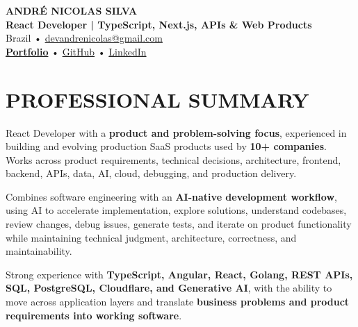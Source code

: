 \documentclass[10pt,a4paper]{article}
\begin{document}

\begin{center}

    {\LARGE \textbf{ANDRÉ NICOLAS SILVA}} \\[-2pt]

    {\normalsize \textbf{React Developer | TypeScript, Next.js, APIs \& Web Products}} \\[1pt]

    \footnotesize
    Brazil \quad • \quad
    \href{mailto:devandrenicolas@gmail.com}{devandrenicolas@gmail.com} \\[-1pt]

    \textbf{\href{https://portfolio-andrenicolas.vercel.app}{Portfolio}}
    \quad • \quad
    \href{https://github.com/devAndreNicolas}{GitHub}
    \quad • \quad
    \href{https://www.linkedin.com/in/devandrenicolas}{LinkedIn}

\end{center}

\vspace{-3pt}


\section*{PROFESSIONAL SUMMARY}

\footnotesize

React Developer with a \textbf{product and problem-solving focus},
experienced in building and evolving production SaaS products used by
\textbf{10+ companies}. Works across product requirements, technical
decisions, architecture, frontend, backend, APIs, data, AI, cloud,
debugging, and production delivery.

Combines software engineering with an \textbf{AI-native development
workflow}, using AI to accelerate implementation, explore solutions,
understand codebases, review changes, debug issues, generate tests,
and iterate on product functionality while maintaining technical
judgment, architecture, correctness, and maintainability.

Strong experience with \textbf{TypeScript, Angular, React, Golang,
REST APIs, SQL, PostgreSQL, Cloudflare, and Generative AI}, with the
ability to move across application layers and translate
\textbf{business problems and product requirements into working
software}.
\end{document}
